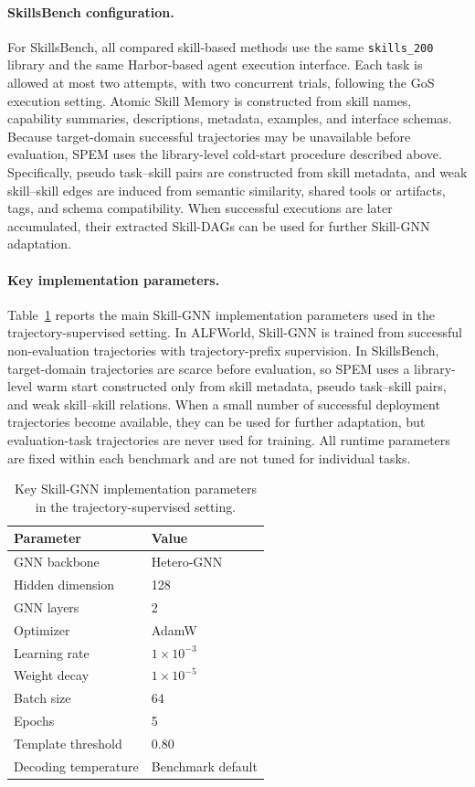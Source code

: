 \documentclass[letterpaper]{article}
\newcommand{\model}{\textsc{SPEM}}
\begin{document}
\paragraph{SkillsBench configuration.}
For SkillsBench, all compared skill-based methods use the same
\texttt{skills\_200} library and the same Harbor-based agent execution
interface. Each task is allowed at most two attempts, with two concurrent trials,
following the GoS execution setting. Atomic Skill Memory is constructed from
skill names, capability summaries, descriptions, metadata, examples, and
interface schemas. Because target-domain successful trajectories may be
unavailable before evaluation, \model{} uses the library-level cold-start
procedure described above. Specifically, pseudo task--skill pairs are
constructed from skill metadata, and weak skill--skill edges are induced from
semantic similarity, shared tools or artifacts, tags, and schema compatibility.
When successful executions are later accumulated, their extracted Skill-DAGs can
be used for further Skill-GNN adaptation.

\paragraph{Key implementation parameters.}
Table~\ref{tab:key_impl_params} reports the main Skill-GNN implementation
parameters used in the trajectory-supervised setting. In ALFWorld, Skill-GNN is
trained from successful non-evaluation trajectories with trajectory-prefix
supervision. In SkillsBench, target-domain trajectories are scarce before
evaluation, so \model{} uses a library-level warm start constructed only from
skill metadata, pseudo task--skill pairs, and weak skill--skill relations. When
a small number of successful deployment trajectories become available, they can
be used for further adaptation, but evaluation-task trajectories are never used
for training. All runtime parameters are fixed within each benchmark and are not
tuned for individual tasks.

\begin{table}[t]
\centering
\small
\setlength{\tabcolsep}{5pt}
\renewcommand{\arraystretch}{1.08}
\begin{tabular}{ll}
\toprule
Parameter & Value \\
\midrule
GNN backbone & Hetero-GNN \\
Hidden dimension & 128 \\
GNN layers & 2 \\
Optimizer & AdamW \\
Learning rate & $1\times10^{-3}$ \\
Weight decay & $1\times10^{-5}$ \\
Batch size & 64 \\
Epochs & 5 \\
Template threshold & 0.80 \\
Decoding temperature & Benchmark default \\
\bottomrule
\end{tabular}
\caption{Key Skill-GNN implementation parameters in the trajectory-supervised
setting.}
\label{tab:key_impl_params}
\end{table}
\end{document}
